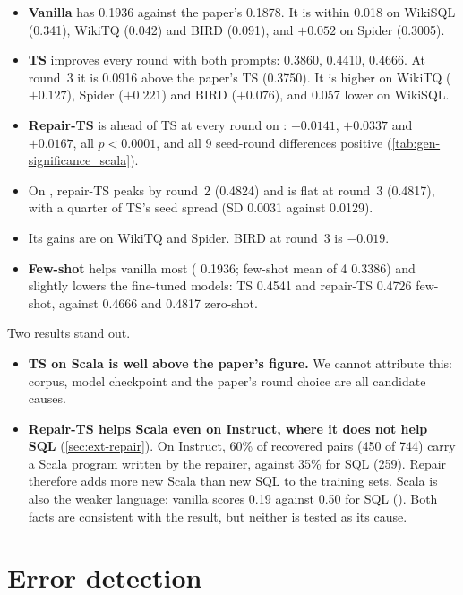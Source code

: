 \begin{observation}
\begin{itemize}
\item \textbf{Vanilla} has \ZSiv{} 0.1936 against the paper's 0.1878. It is within 0.018 on WikiSQL
(0.341), WikiTQ (0.042) and BIRD (0.091), and $+0.052$ on Spider (0.3005).
\item \textbf{TS} improves every round with both prompts: \ZSiv{} 0.3860, 0.4410, 0.4666. At round~3 it is 0.0916
above the paper's TS (0.3750). It is higher on WikiTQ ($+0.127$), Spider ($+0.221$) and BIRD ($+0.076$),
and 0.057 lower on WikiSQL.
\item \textbf{Repair-TS} is ahead of TS at every round on \Mviii{}: $+0.0141$, $+0.0337$ and $+0.0167$, all
$p<0.0001$, and all 9 seed-round differences positive (\cref{tab:gen-significance_scala}).
\item On \ZSiv{}, repair-TS peaks by round~2 (0.4824) and is flat at round~3 (0.4817), with a quarter of TS's seed
spread (SD 0.0031 against 0.0129).
\item Its gains are on WikiTQ and Spider. BIRD at round~3 is $-0.019$.
\item \textbf{Few-shot} helps vanilla most (\ZSiv{} 0.1936; few-shot mean of 4 0.3386) and slightly lowers the
fine-tuned models: TS 0.4541 and repair-TS 0.4726 few-shot, against 0.4666 and 0.4817 zero-shot.
\end{itemize}
\end{observation}

\begin{interpretation}
Two results stand out.
\begin{itemize}
\item \textbf{TS on Scala is well above the paper's figure.} We cannot attribute this: corpus, model
checkpoint and the paper's round choice are all candidate causes.
\item \textbf{Repair-TS helps Scala even on Instruct, where it does not help SQL} (\cref{sec:ext-repair}). On
Instruct, 60\% of recovered pairs (450 of 744) carry a Scala program written by the repairer, against 35\% for SQL
(259). Repair therefore adds more new Scala than new SQL to the training sets. Scala is also the weaker language:
vanilla scores 0.19 against 0.50 for SQL (\ZSiv{}). Both facts are consistent with the result, but neither is tested
as its cause.
\end{itemize}
\end{interpretation}

\section{Error detection}\label{sec:results-ed}

